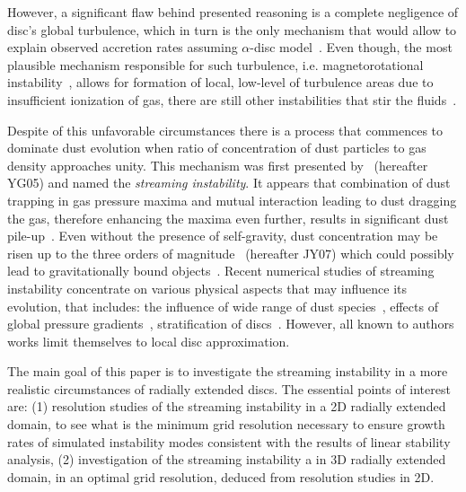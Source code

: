 \par However, a significant flaw behind presented reasoning is a complete
negligence of disc's global turbulence, which in turn is the only mechanism that
would allow to explain observed accretion rates assuming $\alpha$-disc
model~\citep{SS73}. Even though, the most plausible mechanism responsible for
such turbulence, i.e. magnetorotational instability~\citep{BH98}, allows for
formation of local, low-level of turbulence areas due to insufficient ionization
of gas, there are still other instabilities that stir the fluids~\citep{LP10}.

\par Despite of this unfavorable circumstances there is a process that commences
to dominate dust evolution when ratio of concentration of dust particles to gas
density approaches unity. This mechanism was first presented by~\cite{YG05}
(hereafter YG05) and named the {\it streaming instability}. It appears that
combination of dust trapping in gas pressure maxima and mutual interaction
leading to dust dragging the gas, therefore enhancing the maxima even further,
results in significant dust pile-up~\citep{J11}. Even without the presence of
self-gravity, dust concentration may be risen up to the three orders of
magnitude~\citep{JY07} (hereafter JY07) which could possibly lead to
gravitationally bound objects~\citep{J07}. Recent numerical studies of
streaming instability concentrate on various physical aspects that may influence
its evolution, that includes: the influence of wide range of dust
species~\citep{BS10a}, effects of global pressure gradients~\citep{BS10b},
stratification of discs~\citep{T12}. However, all known to authors works limit
themselves to local disc approximation. 

The main goal of this paper is to investigate the streaming instability in a
more realistic circumstances of radially extended discs. The essential points of
interest are:
(1) resolution studies of the streaming instability in a 2D radially extended
domain,  to see what is the minimum  grid resolution necessary to ensure growth
rates of  simulated instability modes consistent with the results of linear
stability analysis, (2) investigation of the streaming instability a in 3D
radially extended domain, in an optimal  grid resolution,  deduced from
resolution studies in 2D.

